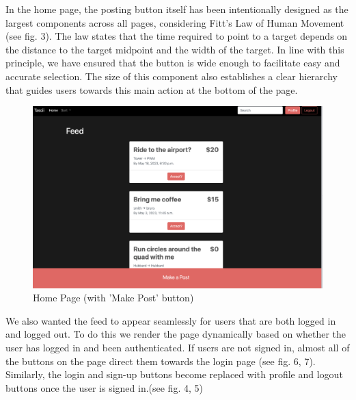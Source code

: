 In the home page, the posting button itself has been intentionally designed as the largest components across all pages, considering Fitt's Law of Human Movement (see fig. 3). The law states that the time required to point to a target depends on the distance to the target midpoint and the width of the target. In line with this principle, we have ensured that the button is wide enough to facilitate easy and accurate selection. The size of this component also establishes a clear hierarchy that guides users towards this main action at the bottom of the page.

\begin{figure}[ht]
        \centering
        \caption{Home Page (with 'Make Post' button)}
        \includegraphics[width=1\textwidth]{images/Home.png}
        
        \label{fig:bird1}
    \end{figure}


We also wanted the feed to appear seamlessly for users that are both logged in and logged out. To do this we render the page dynamically based on whether the user has logged in and been authenticated. If users are not signed in, almost all of the buttons on the page direct them towards the login page (see fig. 6, 7). Similarly, the login and sign-up buttons become replaced with profile and logout buttons once the user is signed in.(see fig. 4, 5)

